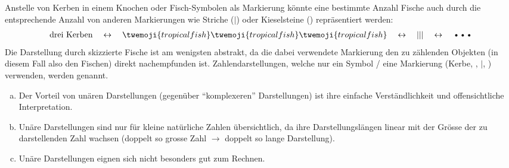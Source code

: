 Anstelle von Kerben in einem Knochen oder Fisch-Symbolen als Markierung könnte eine bestimmte Anzahl Fische auch durch
die entsprechende Anzahl von anderen Markierungen wie Striche ($|$) oder Kieselsteine (\textbullet) repräsentiert werden:
\begin{align*}
	\text{drei Kerben} \quad\leftrightarrow\quad \twemoji{tropical fish}\twemoji{tropical fish}\twemoji{tropical fish} \quad\leftrightarrow\quad |||
	\quad\leftrightarrow\quad \text{\textbullet\textbullet\textbullet}
\end{align*}
Die Darstellung durch skizzierte Fische ist am wenigsten abstrakt, da die dabei verwendete Markierung den zu zählenden Objekten (in diesem Fall also den Fischen) direkt nachempfunden ist.
Zahlendarstellungen, welche nur ein Symbol / eine Markierung (Kerbe, , $|$, \textbullet) verwenden, werden
 genannt.

\begin{myremark}\leavevmode
	\begin{enumerate}[(a)]
		\item Der Vorteil von unären Darstellungen (gegenüber \enquote{komplexeren} Darstellungen) ist ihre einfache Verständlichkeit und
		      offensichtliche Interpretation.
		\item Unäre Darstellungen sind nur für kleine natürliche Zahlen übersichtlich, da ihre Darstellungslängen linear mit der Grösse der zu
		      darstellenden Zahl wachsen (doppelt so grosse Zahl $\rightarrow$ doppelt so lange Darstellung).
		\item Unäre Darstellungen eignen sich nicht besonders gut zum Rechnen.
	\end{enumerate}
\end{myremark}

